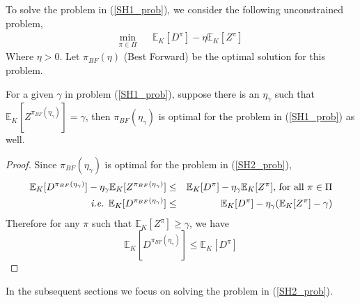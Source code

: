 \documentclass[onecolumn]{IEEEtran}
\begin{document}
To solve the problem in (\ref{SH1_prob}), we consider the following
unconstrained problem, 
\begin{eqnarray}
\label{SH2_prob}
\min_{{\pi}\in{\Pi}}&&\mathbb{E}_K[D^{\pi}]-\eta\mathbb{E}_K[Z^{\pi}]
\end{eqnarray}
Where $\eta>0$.  Let $\pi_{BF}(\eta)$ (Best Forward) be the optimal
solution for this problem.
\begin{lemma} \label{lem:conversion_to_mdp}
  For a given $\gamma$ in problem (\ref{SH1_prob}), suppose there is
  an $\eta_\gamma$ such that
  $\mathbb{E}_K[Z^{\pi_{BF}(\eta_\gamma)}]=\gamma$, then
  $\pi_{BF}(\eta_\gamma)$ is optimal for the problem in
  (\ref{SH1_prob}) as well.
\end{lemma}
\begin{proof}
 Since $\pi_{BF}(\eta_\gamma)$ is optimal for the problem in (\ref{SH2_prob}), 
\begin{eqnarray*}
  \mathbb{E}_K[D^{\pi_{BF}(\eta_\gamma)}]-\eta_\gamma\mathbb{E}_K[Z^{\pi_{BF}(\eta_\gamma)}]&\le&
  \mathbb{E}_K[D^{\pi}]- \eta_\gamma \mathbb{E}_K[Z^{\pi}] \mbox{, for all } \pi\in\Pi\\
  \mbox{ \emph{i.e.} }\mathbb{E}_K[D^{\pi_{BF}(\eta_\gamma)}]&\le&\mathbb{E}_K[D^{\pi}]-
  \eta_\gamma (\mathbb{E}_K[Z^{\pi}]-\gamma)
\end{eqnarray*}
Therefore for any $\pi$ such that $\mathbb{E}_K[Z^{\pi}]\ge \gamma$, we have
\begin{equation*}
	\mathbb{E}_K[D^{\pi_{BF}(\eta_\gamma)}]\le\mathbb{E}_K[D^{\pi}]
\end{equation*}
\end{proof}
In the subsequent sections we focus on solving the problem in (\ref{SH2_prob}).
\end{document}
